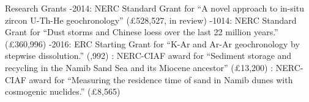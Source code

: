 \documentclass{resume}
\begin{document}
\begin{category}{Research Grants}
  -2014: NERC Standard Grant for ``A novel approach to in-situ zircon U-Th-He geochronology'' (\pounds 528,527, in review) 
  -1014: NERC Standard Grant for ``Dust storms and Chinese loess over the last 22 million
years.'' (\pounds 360,996)
  -2016: ERC Starting Grant for ``K-Ar and Ar-Ar geochronology by stepwise dissolution.''
(,992)
  : NERC-CIAF award for ``Sediment storage and recycling in the Namib Sand Sea and
its Miocene ancestor'' (\pounds 13,200)
  : NERC-CIAF award for 
``Measuring the residence time of sand in Namib dunes with cosmogenic nuclides.''
(\pounds 8,565)
\end{category}


\end{document}
